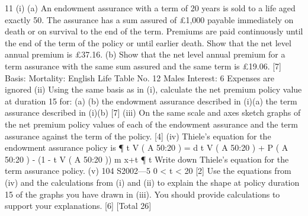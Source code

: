 \documentclass[a4paper,12pt]{article}
\begin{document}
\begin{enumerate}
11
(i)
(a)
An endowment assurance with a term of 20 years is sold to a life aged
exactly 50. The assurance has a sum assured of £1,000 payable
immediately on death or on survival to the end of the term. Premiums
are paid continuously until the end of the term of the policy or until
earlier death.
Show that the net level annual premium is £37.16.
(b)
Show that the net level annual premium for a term assurance with the
same sum assured and the same term is £19.06.
[7]
Basis: Mortality: English Life Table No. 12 Males
Interest: 6%
Expenses are ignored
(ii)
Using the same basis as in (i), calculate the net premium policy value at
duration 15 for:
(a)
(b)
the endowment assurance described in (i)(a)
the term assurance described in (i)(b)
[7]
(iii) On the same scale and axes sketch graphs of the net premium policy values of
each of the endowment assurance and the term assurance against the term of
the policy.
[4]
(iv) Thiele’s equation for the endowment assurance policy is
¶
t V ( A 50:20 ) = d t V ( A 50:20 ) + P ( A 50:20 ) - (1 - t V ( A 50:20 )) m x+t
¶ t
Write down Thiele’s equation for the term assurance policy.
(v)
104 S2002—5
0 < t < 20
[2]
Use the equations from (iv) and the calculations from (i) and (ii) to explain the
shape at policy duration 15 of the graphs you have drawn in (iii). You should
provide calculations to support your explanations.
[6]
[Total 26]


\end{enumerate}
\end{document}
